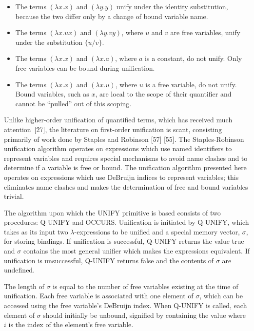 \begin{itemize}
\item The terms \((\lambda x.x)\) and \((\lambda y.y)\) unify under the identity
substitution, because the two differ only by a change of bound variable name.
\item The terms \((\lambda x.ux)\) and \((\lambda y.vy)\), where \(u\) and \(v\)
are free variables, unify under the substitution \(\{u/v\}\).
\item The terms \((\lambda x.x)\) and \((\lambda x.a)\), where \(a\) is a
constant, do not unify. Only free variables can be bound during unification.
\item The terms \((\lambda x.x)\) and \((\lambda x.u)\), where \(u\) is a free
variable, do not unify. Bound variables, such as \(x\), are local to the scope
of their quantifier and cannot be ``pulled'' out of this scoping.
\end{itemize}

Unlike higher-order unification of quantified terms, which has received much
attention~[27], the literature on first-order unification is scant, consisting
primarily of work done by Staples and Robinson [57] [55]. The Staples-Robinson
unification algorithm operates on expressions which use named identifiers to
represent variables and requires special mechanisms to avoid name clashes and to
determine if a variable is free or bound. The unification algorithm presented
here operates on expressions which use DeBruijn indices to represent variables;
this eliminates name clashes and makes the determination of free and bound
variables trivial.

The algorithm upon which the UNIFY primitive is based consists of two
procedures: Q-UNIFY and OCCURS. Unification is initiated by Q-UNIFY, which takes
as its input two \(\lambda\)-expressions to be unified and a special memory
vector, \(\sigma\), for storing bindings. If unification is successful, Q-UNIFY
returns the value true and \(\sigma\) contains the most general unifier which
makes the expressions equivalent. If unification is unsuccessful, Q-UNIFY
returns false and the contents of \(\sigma\) are undefined.

The length of \(\sigma\) is equal to the number of free variables existing at
the time of unification. Each free variable is associated with one element of
\(\sigma\), which can be accessed using the free variable's DeBruijn index. When
Q-UNIFY is called, each element of \(\sigma\) should initially be unbound,
signified by containing the value  where \(i\) is the index of
the element's free variable.

